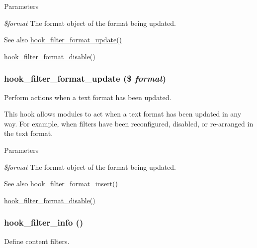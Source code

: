 \begin{DoxyParams}{Parameters}
\item[{\em \$format}]The format object of the format being updated.\end{DoxyParams}
\begin{DoxySeeAlso}{See also}
\hyperlink{group__hooks_gaf9e4490f3ca224c161481754a3332c92}{hook\_\-filter\_\-format\_\-update()} 

\hyperlink{group__hooks_gae4873bf6d76c33475296917d304719e9}{hook\_\-filter\_\-format\_\-disable()} 
\end{DoxySeeAlso}
\hypertarget{group__hooks_gaf9e4490f3ca224c161481754a3332c92}{
\subsubsection[{hook\_\-filter\_\-format\_\-update}]{\setlength{\rightskip}{0pt plus 5cm}hook\_\-filter\_\-format\_\-update (\$ {\em format})}}
\label{group__hooks_gaf9e4490f3ca224c161481754a3332c92}
Perform actions when a text format has been updated.

This hook allows modules to act when a text format has been updated in any way. For example, when filters have been reconfigured, disabled, or re-\/arranged in the text format.


\begin{DoxyParams}{Parameters}
\item[{\em \$format}]The format object of the format being updated.\end{DoxyParams}
\begin{DoxySeeAlso}{See also}
\hyperlink{group__hooks_ga3729c44379f4e5298c067795e9aca481}{hook\_\-filter\_\-format\_\-insert()} 

\hyperlink{group__hooks_gae4873bf6d76c33475296917d304719e9}{hook\_\-filter\_\-format\_\-disable()} 
\end{DoxySeeAlso}
\hypertarget{group__hooks_gaf2a2f2a46589420df896a0d42247f15a}{
\subsubsection[{hook\_\-filter\_\-info}]{\setlength{\rightskip}{0pt plus 5cm}hook\_\-filter\_\-info ()}}
\label{group__hooks_gaf2a2f2a46589420df896a0d42247f15a}
Define content filters.

